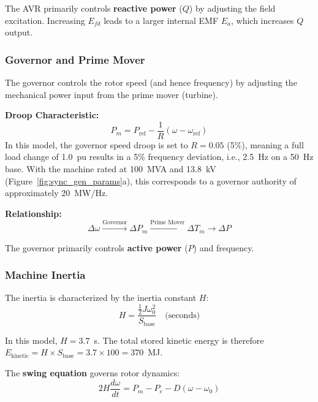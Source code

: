 \documentclass[12pt, a4paper]{article}
\begin{document}
The AVR primarily controls \textbf{reactive power} ($Q$) by adjusting the field excitation. Increasing $E_{fd}$ leads to a larger internal EMF $E_a$, which increases $Q$ output.

\subsubsection{Governor and Prime Mover}

The governor controls the rotor speed (and hence frequency) by adjusting the mechanical power input from the prime mover (turbine).

\textbf{Droop Characteristic:}
\begin{equation}
    P_m = P_{\text{ref}} - \frac{1}{R} (\omega - \omega_{\text{ref}})
    \label{eq:droop}
\end{equation}
In this model, the governor speed droop is set to $R = 0.05$ (5\%), meaning a full load change of 1.0~pu results in a 5\% frequency deviation, i.e., 2.5~Hz on a 50~Hz base. With the machine rated at 100~MVA and 13.8~kV (Figure~\ref{fig:sync_gen_params}a), this corresponds to a governor authority of approximately 20~MW/Hz.

\textbf{Relationship:}
\begin{equation}
    \Delta \omega \xrightarrow{\text{Governor}} \Delta P_m \xrightarrow{\text{Prime Mover}} \Delta T_m \xrightarrow{} \Delta P
    \label{eq:gov_chain}
\end{equation}

The governor primarily controls \textbf{active power} ($P$) and frequency.

\subsubsection{Machine Inertia}

The inertia is characterized by the inertia constant $H$:
\begin{equation}
    H = \frac{\frac{1}{2} J \omega_0^2}{S_{\text{base}}} \quad \text{(seconds)}
    \label{eq:inertia}
\end{equation}

In this model, $H = 3.7$~s. The total stored kinetic energy is therefore $E_{\text{kinetic}} = H \times S_{\text{base}} = 3.7 \times 100 = 370$~MJ. 

The \textbf{swing equation} governs rotor dynamics:
\begin{equation}
    2H \frac{d\omega}{dt} = P_m - P_e - D(\omega - \omega_0)
    \label{eq:swing}
\end{equation}
\end{document}
